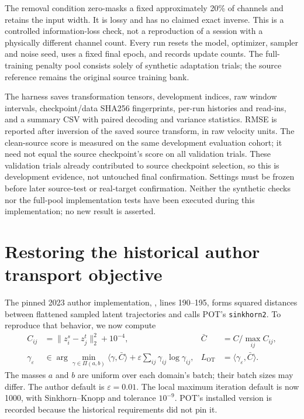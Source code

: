 \documentclass[11pt,a4paper]{article}
\begin{document}
The removal condition zero-masks a fixed approximately 20\% of channels and
retains the input width. It is lossy and has no claimed exact inverse. This
is a controlled information-loss check, not a reproduction of a session with
a physically different channel count. Every run resets the model, optimizer,
sampler and noise seed, uses a fixed final epoch, and records update counts.
The full-training penalty pool consists solely of synthetic adaptation
trials; the source reference remains the original source training bank.

The harness saves transformation tensors, development indices, raw window
intervals, checkpoint/data SHA256 fingerprints, per-run histories and read-ins,
and a summary CSV with paired decoding and variance statistics. RMSE is
reported after inversion of the saved source transform, in raw velocity
units. The clean-source score is measured on the same development evaluation
cohort; it need not equal the source checkpoint's score on all validation
trials. These validation trials already contributed to source checkpoint
selection, so this is development evidence, not untouched final confirmation.
Settings must be frozen before later source-test or real-target confirmation.
Neither the synthetic checks nor the full-pool implementation tests have
been executed during this implementation; no new result is asserted.

\section{Restoring the historical author transport objective}

The pinned 2023 author implementation, ,
lines 190--195, forms squared distances between flattened sampled latent
trajectories and calls POT's \texttt{sinkhorn2}. To reproduce that behavior,
we now compute
\begin{align}
 C_{ij} &= \lVert z_i^s-z_j^t\rVert_2^2+10^{-4},
 & \bar C &= C/\max_{ij}C_{ij},\\
 \gamma_\varepsilon &\in \arg\min_{\gamma\in\Pi(a,b)}
 \langle\gamma,\bar C\rangle+
 \varepsilon\sum_{ij}\gamma_{ij}\log\gamma_{ij},
 & L_{\mathrm{OT}} &= \langle\gamma_\varepsilon,\bar C\rangle.
\end{align}
The masses $a$ and $b$ are uniform over each domain's batch; their batch
sizes may differ. The author default is $\varepsilon=0.01$. The local maximum
iteration default is now 1000, with Sinkhorn--Knopp and tolerance $10^{-9}$.
POT's installed version is recorded because the historical requirements
did not pin it.
\end{document}
